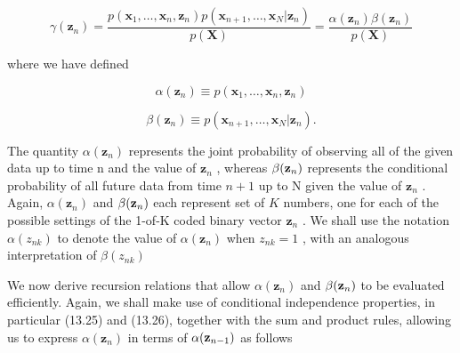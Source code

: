 \documentclass[
  10
]{article}
\begin{document}
\[
\gamma (\mathbf {z} _ {n}) = \frac {p (\mathbf {x} _ {1} , \ldots , \mathbf {x} _ {n} , \mathbf {z} _ {n}) p (\mathbf {x} _ {n + 1} , \ldots , \mathbf {x} _ {N} | \mathbf {z} _ {n})}{p (\mathbf {X})} = \frac {\alpha (\mathbf {z} _ {n}) \beta (\mathbf {z} _ {n})}{p (\mathbf {X})}\tag{13.33}
\]

where we have defined

\[
\alpha (\mathbf {z} _ {n}) \equiv p (\mathbf {x} _ {1}, \ldots , \mathbf {x} _ {n}, \mathbf {z} _ {n})\tag{13.34}
\]

\[
\beta (\mathbf {z} _ {n}) \equiv p (\mathbf {x} _ {n + 1}, \dots , \mathbf {x} _ {N} | \mathbf {z} _ {n}).\tag{13.35}
\]

The quantity \(\alpha ( { \mathbf z } _ { n } )\) represents the joint
probability of observing all of the given data up to time n and the
value of \(\mathbf { z } _ { n }\) , whereas
\(\beta ( { \bf z } _ { n } )\) represents the conditional probability
of all future data from time \(n + 1\) up to N given the value of
\(\mathbf { z } _ { n }\) . Again, \(\alpha ( { \mathbf z } _ { n } )\)
and \(\beta ( { \bf z } _ { n } )\) each represent set of \(K\) numbers,
one for each of the possible settings of the 1-of-K coded binary vector
\(\mathbf { z } _ { n }\) . We shall use the notation
\(\alpha ( z _ { n k } )\) to denote the value of
\(\alpha ( { \mathbf z } _ { n } )\) when \(z _ { n k } = 1\) , with an
analogous interpretation of \(\beta ( z _ { n k } )\)

We now derive recursion relations that allow
\(\alpha ( { \mathbf z } _ { n } )\) and \(\beta ( { \bf z } _ { n } )\)
to be evaluated efficiently. Again, we shall make use of conditional
independence properties, in particular (13.25) and (13.26), together
with the sum and product rules, allowing us to express
\(\alpha ( { \mathbf z } _ { n } )\) in terms of
\(\alpha ( { \bf z } _ { n - 1 } )\) as follows
\end{document}
